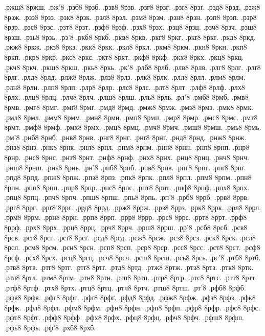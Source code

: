 {.ржш8 8ржш.
.рж'8
.рзб8 8рзб.
.рзв8 8рзв.
.рзг8 8рзг.
.рзґ8 8рзґ.
.рзд8 8рзд.
.рзж8 8рзж.
.рзз8 8рзз.
.рзк8 8рзк.
.рзл8 8рзл.
.рзм8 8рзм.
.рзн8 8рзн.
.рзп8 8рзп.
.рзр8 8рзр.
.рзс8 8рзс.
.рзт8 8рзт.
.рзф8 8рзф.
.рзх8 8рзх.
.рзц8 8рзц.
.рзч8 8рзч.
.рзш8 8рзш.
.рзь8 8рзь.
.рз'8
.ркб8 8ркб.
.ркв8 8ркв.
.ркг8 8ркг.
.ркґ8 8ркґ.
.ркд8 8ркд.
.ркж8 8ркж.
.ркз8 8ркз.
.ркк8 8ркк.
.ркл8 8ркл.
.ркм8 8ркм.
.ркн8 8ркн.
.ркп8 8ркп.
.ркр8 8ркр.
.ркс8 8ркс.
.ркт8 8ркт.
.ркф8 8ркф.
.ркх8 8ркх.
.ркц8 8ркц.
.ркч8 8ркч.
.ркш8 8ркш.
.ркь8 8ркь.
.рк'8
.рлб8 8рлб.
.рлв8 8рлв.
.рлг8 8рлг.
.рлґ8 8рлґ.
.рлд8 8рлд.
.рлж8 8рлж.
.рлз8 8рлз.
.рлк8 8рлк.
.рлл8 8рлл.
.рлм8 8рлм.
.рлн8 8рлн.
.рлп8 8рлп.
.рлр8 8рлр.
.рлс8 8рлс.
.рлт8 8рлт.
.рлф8 8рлф.
.рлх8 8рлх.
.рлц8 8рлц.
.рлч8 8рлч.
.рлш8 8рлш.
.рль8 8рль.
.рл'8
.рмб8 8рмб.
.рмв8 8рмв.
.рмг8 8рмг.
.рмґ8 8рмґ.
.рмд8 8рмд.
.рмж8 8рмж.
.рмз8 8рмз.
.рмк8 8рмк.
.рмл8 8рмл.
.рмм8 8рмм.
.рмн8 8рмн.
.рмп8 8рмп.
.рмр8 8рмр.
.рмс8 8рмс.
.рмт8 8рмт.
.рмф8 8рмф.
.рмх8 8рмх.
.рмц8 8рмц.
.рмч8 8рмч.
.рмш8 8рмш.
.рмь8 8рмь.
.рм'8
.рнб8 8рнб.
.рнв8 8рнв.
.рнг8 8рнг.
.рнґ8 8рнґ.
.рнд8 8рнд.
.рнж8 8рнж.
.рнз8 8рнз.
.рнк8 8рнк.
.рнл8 8рнл.
.рнм8 8рнм.
.рнн8 8рнн.
.рнп8 8рнп.
.рнр8 8рнр.
.рнс8 8рнс.
.рнт8 8рнт.
.рнф8 8рнф.
.рнх8 8рнх.
.рнц8 8рнц.
.рнч8 8рнч.
.рнш8 8рнш.
.рнь8 8рнь.
.рн'8
.рпб8 8рпб.
.рпв8 8рпв.
.рпг8 8рпг.
.рпґ8 8рпґ.
.рпд8 8рпд.
.рпж8 8рпж.
.рпз8 8рпз.
.рпк8 8рпк.
.рпл8 8рпл.
.рпм8 8рпм.
.рпн8 8рпн.
.рпп8 8рпп.
.рпр8 8рпр.
.рпс8 8рпс.
.рпт8 8рпт.
.рпф8 8рпф.
.рпх8 8рпх.
.рпц8 8рпц.
.рпч8 8рпч.
.рпш8 8рпш.
.рпь8 8рпь.
.рп'8
.ррб8 8ррб.
.ррв8 8ррв.
.ррг8 8ррг.
.ррґ8 8ррґ.
.ррд8 8ррд.
.ррж8 8ррж.
.ррз8 8ррз.
.ррк8 8ррк.
.ррл8 8ррл.
.ррм8 8ррм.
.ррн8 8ррн.
.ррп8 8ррп.
.ррр8 8ррр.
.ррс8 8ррс.
.ррт8 8ррт.
.ррф8 8ррф.
.ррх8 8ррх.
.ррц8 8ррц.
.ррч8 8ррч.
.ррш8 8ррш.
.рр'8
.рсб8 8рсб.
.рсв8 8рсв.
.рсг8 8рсг.
.рсґ8 8рсґ.
.рсд8 8рсд.
.рсж8 8рсж.
.рсз8 8рсз.
.рск8 8рск.
.рсл8 8рсл.
.рсм8 8рсм.
.рсн8 8рсн.
.рсп8 8рсп.
.рср8 8рср.
.рсс8 8рсс.
.рст8 8рст.
.рсф8 8рсф.
.рсх8 8рсх.
.рсц8 8рсц.
.рсч8 8рсч.
.рсш8 8рсш.
.рсь8 8рсь.
.рс'8
.ртб8 8ртб.
.ртв8 8ртв.
.ртг8 8ртг.
.ртґ8 8ртґ.
.ртд8 8ртд.
.ртж8 8ртж.
.ртз8 8ртз.
.ртк8 8ртк.
.ртл8 8ртл.
.ртм8 8ртм.
.ртн8 8ртн.
.ртп8 8ртп.
.ртр8 8ртр.
.ртс8 8ртс.
.ртт8 8ртт.
.ртф8 8ртф.
.ртх8 8ртх.
.ртц8 8ртц.
.ртч8 8ртч.
.ртш8 8ртш.
.рт'8
.рфб8 8рфб.
.рфв8 8рфв.
.рфг8 8рфг.
.рфґ8 8рфґ.
.рфд8 8рфд.
.рфж8 8рфж.
.рфз8 8рфз.
.рфк8 8рфк.
.рфл8 8рфл.
.рфм8 8рфм.
.рфн8 8рфн.
.рфп8 8рфп.
.рфр8 8рфр.
.рфс8 8рфс.
.рфт8 8рфт.
.рфф8 8рфф.
.рфх8 8рфх.
.рфц8 8рфц.
.рфч8 8рфч.
.рфш8 8рфш.
.рфь8 8рфь.
.рф'8
.рхб8 8рхб.
}

